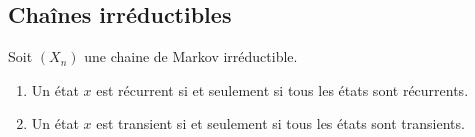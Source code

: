\subsection{Chaînes irréductibles}

\begin{proposition}     \label{Proptoustanstousrecirrsi}
	Soit \( (X_n)\) une chaine de Markov irréductible.
	\begin{enumerate}
		\item
		      Un état \( x\) est récurrent si et seulement si tous les états sont récurrents.
		\item
		      Un état \( x\) est transient si et seulement si tous les états sont transients.
	\end{enumerate}
\end{proposition}

